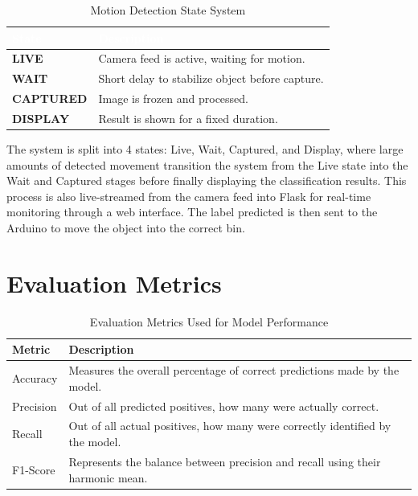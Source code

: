 \documentclass[12pt]{article}
\begin{document}
 \begin{table}[H]
\centering
\caption{Motion Detection State System}
\label{tab:motion_states}

\begin{tabular}{|l|p{10cm}|}
\hline
\rowcolor[HTML]{0B5D7A}
\textcolor{white}{\textbf{State}} & 
\textcolor{white}{\textbf{Description}} \\ \hline

\textbf{LIVE} & 
Camera feed is active, waiting for motion. \\ \hline

\textbf{WAIT} & 
Short delay to stabilize object before capture. \\ \hline

\textbf{CAPTURED} & 
Image is frozen and processed. \\ \hline

\textbf{DISPLAY} & 
Result is shown for a fixed duration. \\ \hline

\end{tabular}
\end{table}
 
 The system is split into 4 states: Live, Wait, Captured, and Display, where large amounts of detected movement transition the system from the Live state into the Wait and Captured stages before finally displaying the classification results. This process is also live-streamed from the camera feed into Flask for real-time monitoring through a web interface. The label predicted is then sent to the Arduino to move the object into the correct bin.

\section*{Evaluation Metrics}
\begin{table}[H]
\caption{Evaluation Metrics Used for Model Performance}
\centering
\begin{tabular}{|p{3cm}|p{9cm}|}
\hline
\textbf{Metric} & \textbf{Description} \\ \hline

Accuracy &
Measures the overall percentage of correct predictions made by the model. \\ \hline

Precision &
Out of all predicted positives, how many were actually correct. \\ \hline

Recall &
Out of all actual positives, how many were correctly identified by the model. \\ \hline

F1-Score &
Represents the balance between precision and recall using their harmonic mean. \\ \hline

\end{tabular}
\label{tab:metrics}
\end{table}
\end{document}
